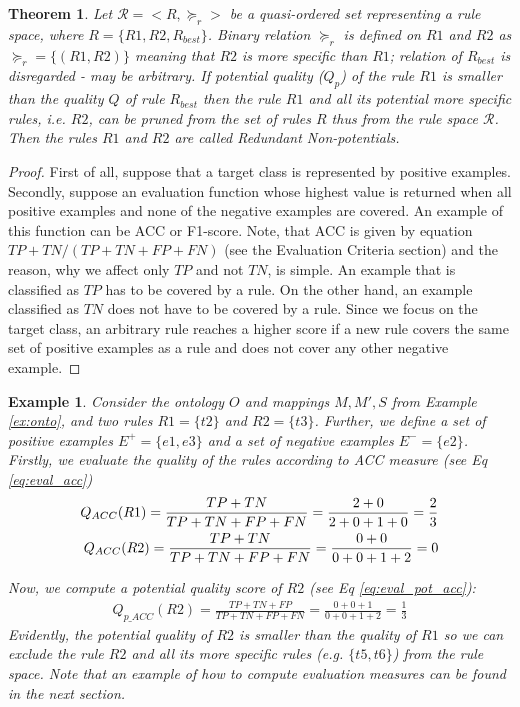 \documentclass{bmcart}
\newtheorem{example}{Example}
\newtheorem{theorem}{Theorem}
\begin{document}
\begin{theorem}
    Let $\mathcal{R} = <R, \succeq_{r}>$ be a quasi-ordered set representing a rule space, where $R = \{R1, R2, R_{best}\}$. Binary relation $\succeq_{r}$ is defined on $R1$ and $R2$ as $\succeq_{r} = \{(R1, R2)\}$ meaning that $R2$ is more specific than $R1$; relation of $R_{best}$ is disregarded - may be arbitrary. If potential quality ($Q_p$) of the rule $R1$ is smaller than the quality $Q$ of rule $R_{best}$ then the rule $R1$ and all its potential more specific rules, i.e. $R2$, can be pruned from the set of rules $R$ thus from the rule space $\mathcal{R}$. Then the rules $R1$ and $R2$ are called \textit{Redundant Non-potentials}.
\end{theorem}

\begin{proof}
   First of all, suppose that a target class is represented by positive examples. Secondly, suppose an evaluation function whose highest value is returned when all positive examples and none of the negative examples are covered. An example of this function can be ACC or F1-score. Note, that ACC is given by equation $TP+TN/(TP+TN+FP+FN)$ (see the Evaluation Criteria section) and the reason, why we affect only $TP$ and not $TN$, is simple. An example that is classified as $TP$ has to be covered by a rule. On the other hand, an example classified as $TN$ does not have to be covered by a rule. Since we focus on the target class, an arbitrary rule reaches a higher score if a new rule covers the same set of positive examples as a rule and does not cover any other negative example.
\end{proof}


\begin{example}\label{ex:non_pot}
Consider the ontology $O$ and mappings $M,M',S$ from Example \ref{ex:onto}, and two rules $R1=\{t2\}$ and $R2=\{t3\}$. Further, we define a set of positive examples $E^{+}=\{e1, e3\}$ and a set of negative examples $E^{-}=\{e2\}$. Firstly, we evaluate the quality of the rules according to ACC measure (see Eq \ref{eq:eval_acc})
\begin{eqnarray}
\label{eq:exampleacc}
	{\small Q_{ACC}(R1) = \frac{TP + TN}{TP + TN + FP + FN} = \frac{2 + 0}{2 + 0 + 1 + 0} = \frac{2}{3}} \\
Q_{ACC}(R2) = \frac{TP + TN}{TP + TN + FP + FN} = \frac{0 + 0}{0 + 0 + 1 + 2} = 0
\end{eqnarray}

Now, we compute a potential quality score of $R2$ (see Eq \ref{eq:eval_pot_acc}):
\begin{eqnarray}
\label{eq:exampleaccpot}
Q_{p\_ACC}(R2) = \frac{TP + TN + FP}{TP + TN + FP + FN}= \frac{0 + 0 + 1}{0 + 0 + 1 + 2} = \frac{1}{3}
\end{eqnarray}
Evidently, the potential quality of $R2$ is smaller than the quality of $R1$ so we can exclude the rule $R2$ and all its more specific rules (e.g. $\{t5, t6\}$) from the rule space. Note that an example of how to compute evaluation measures can be found in the next section.

\end{example}
\end{document}

